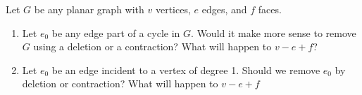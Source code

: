 \documentclass{book}
\begin{document}
\setcounter{cpjt}{24}
\addtocounter{cpjt}{-1}
\begin{activity}\label{activity-19}
\hypertarget{p-254}{}%
Let \(G\) be any planar graph with \(v\) vertices, \(e\) edges, and \(f\) faces.%
\begin{enumerate}[font=\bfseries,label=(\alph*),ref=\alph*]
\item\label{task-29} \hypertarget{p-255}{}%
Let \(e_0\) be any edge part of a cycle in \(G\).  Would it make more sense to remove \(G\) using a deletion or a contraction?  What will happen to \(v - e + f\)?%
\item\label{task-30} \hypertarget{p-256}{}%
Let \(e_0\) be an edge incident to a vertex of degree 1.  Should we remove \(e_0\) by deletion or contraction?  What will happen to \(v- e + f\)%
\end{enumerate}
\end{activity}

\clearpage
\end{document}
